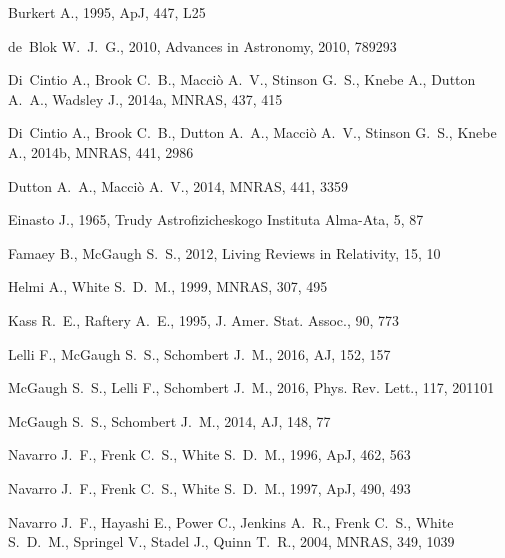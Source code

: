 \begin{thebibliography}{}

Burkert A., 1995, ApJ, 447, L25

de~Blok W.~J.~G., 2010, Advances in Astronomy, 2010, 789293

Di~Cintio A., Brook C.~B., Macci\`o A.~V., Stinson G.~S., Knebe A., Dutton A.~A., Wadsley J., 2014a, MNRAS, 437, 415

Di~Cintio A., Brook C.~B., Dutton A.~A., Macci\`o A.~V., Stinson G.~S., Knebe A., 2014b, MNRAS, 441, 2986

Dutton A.~A., Macci\`o A.~V., 2014, MNRAS, 441, 3359

Einasto J., 1965, Trudy Astrofizicheskogo Instituta Alma-Ata, 5, 87

Famaey B., McGaugh S.~S., 2012, Living Reviews in Relativity, 15, 10

Helmi A., White S.~D.~M., 1999, MNRAS, 307, 495

Kass R.~E., Raftery A.~E., 1995, J. Amer. Stat. Assoc., 90, 773

Lelli F., McGaugh S.~S., Schombert J.~M., 2016, AJ, 152, 157

McGaugh S.~S., Lelli F., Schombert J.~M., 2016, Phys. Rev. Lett., 117, 201101

McGaugh S.~S., Schombert J.~M., 2014, AJ, 148, 77

Navarro J.~F., Frenk C.~S., White S.~D.~M., 1996, ApJ, 462, 563

Navarro J.~F., Frenk C.~S., White S.~D.~M., 1997, ApJ, 490, 493

Navarro J.~F., Hayashi E., Power C., Jenkins A.~R., Frenk C.~S., White S.~D.~M., Springel V., Stadel J., Quinn T.~R., 2004, MNRAS, 349, 1039


\end{thebibliography}
